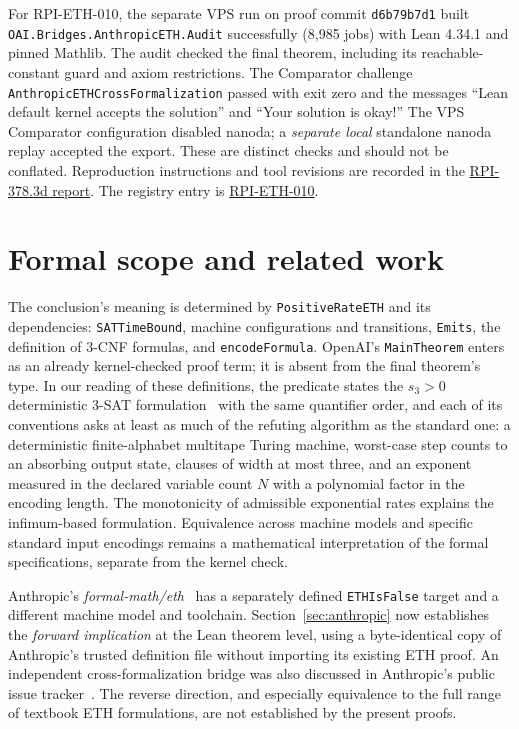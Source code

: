 \documentclass[11pt,letterpaper]{article}
\newcommand{\lean}[1]{\texttt{#1}}
\begin{document}
For RPI-ETH-010, the separate VPS run on proof commit \lean{d6b79b7d1} built \lean{OAI.Bridges.\allowbreak{}AnthropicETH.Audit} successfully (8,985 jobs) with Lean 4.34.1 and pinned Mathlib. The audit checked the final theorem, including its reachable-constant guard and axiom restrictions. The Comparator challenge \lean{AnthropicETH\allowbreak{}CrossFormalization} passed with exit zero and the messages ``Lean default kernel accepts the solution'' and ``Your solution is okay!'' The VPS Comparator configuration disabled nanoda; a \emph{separate local} standalone nanoda replay accepted the export. These are distinct checks and should not be conflated. Reproduction instructions and tool revisions are recorded in the \href{https://github.com/thinkthoughts/math/blob/55fdced45/docs/RPI-378.3d_REPORT.md}{RPI-378.3d report}. The registry entry is \href{https://github.com/thinkthoughts/rpi-index/blob/a0bef7d/data/eth.json}{RPI-ETH-010}.

\section{Formal scope and related work}\label{sec:scope}
The conclusion's meaning is determined by \lean{PositiveRateETH} and its dependencies: \lean{SATTimeBound}, machine configurations and transitions, \lean{Emits}, the definition of 3-CNF formulas, and \lean{encodeFormula}. OpenAI's \lean{MainTheorem} enters as an already kernel-checked proof term; it is absent from the final theorem's type. In our reading of these definitions, the predicate states the $s_3>0$ deterministic 3-SAT formulation~\cite{ip} with the same quantifier order, and each of its conventions asks at least as much of the refuting algorithm as the standard one: a deterministic finite-alphabet multitape Turing machine, worst-case step counts to an absorbing output state, clauses of width at most three, and an exponent measured in the declared variable count $N$ with a polynomial factor in the encoding length. The monotonicity of admissible exponential rates explains the infimum-based formulation. Equivalence across machine models and specific standard input encodings remains a mathematical interpretation of the formal specifications, separate from the kernel check.

Anthropic's \emph{formal-math/eth}~\cite{anthropic} has a separately defined \lean{ETHIsFalse} target and a different machine model and toolchain. Section~\ref{sec:anthropic} now establishes the \emph{forward implication} at the Lean theorem level, using a byte-identical copy of Anthropic's trusted definition file without importing its existing ETH proof. An independent cross-formalization bridge was also discussed in Anthropic's public issue tracker~\cite{anthropicissue}. The reverse direction, and especially equivalence to the full range of textbook ETH formulations, are not established by the present proofs.
\end{document}
